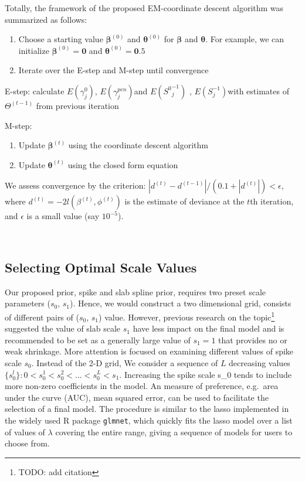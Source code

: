 \documentclass[AMA,STIX1COL,]{WileyNJD-v2}
\begin{document}
Totally, the framework of the proposed EM-coordinate descent algorithm
was summarized as follows:

\begin{enumerate}
\def\labelenumi{\arabic{enumi})}
\item
  Choose a starting value \(\boldsymbol{\beta}^{(0)}\) and
  \(\boldsymbol{\theta}^{(0)}\) for \(\boldsymbol{\beta}\) and
  \(\boldsymbol{\theta}\). For example, we can initialize
  \(\boldsymbol{\beta}^{(0)} = \boldsymbol{0}\) and
  \(\boldsymbol{\theta}^{(0)} = \boldsymbol{0}.5\)
\item
  Iterate over the E-step and M-step until convergence
\end{enumerate}

E-step: calculate \(E(\gamma^0_{j})\), \(E(\gamma^{pen}_{j})\)and
\(E({S^0}^{-1}_{j})\) , \(E({S}^{-1}_{j})\)with estimates of
\(\Theta^{(t-1)}\) from previous iteration

M-step:

\begin{enumerate}
\def\labelenumi{\alph{enumi})}
\item
  Update \(\boldsymbol{\beta}^{(t)}\) using the coordinate descent
  algorithm
\item
  Update \(\boldsymbol{\theta}^{(t)}\) using the closed form equation
\end{enumerate}

We assess convergence by the criterion:
\(|d^{(t)}-d^{(t-1)}|/(0.1+|d^{(t)}|)<\epsilon\), where
\(d^{(t)} = -2l(\beta^{(t)},\phi^{(t)})\) is the estimate of deviance at
the \(t\)th iteration, and \(\epsilon\) is a small value (say
\(10^{-5}\)).

~

\hypertarget{selecting-optimal-scale-values}{%
\subsection{Selecting Optimal Scale
Values}\label{selecting-optimal-scale-values}}

Our proposed prior, spike and slab spline prior, requires two preset
scale parameters (\(s_0\), \(s_1\)). Hence, we would construct a two
dimensional grid, consists of different pairs of (\(s_0\), \(s_1\))
value. However, previous research on the topic\footnote{TODO: add
  citation} suggested the value of slab scale \(s_1\) have less impact
on the final model and is recommended to be set as a generally large
value of \(s_1 = 1\) that provides no or weak shrinkage. More attention
is focused on examining different values of spike scale \(s_0\). Instead
of the 2-D grid, We consider a sequence of \(L\) decreasing values
\(\{s_0^l\}: 0 < s_0^1 < s_0^2 < \dots < s_0^L < s_1\). Increasing the
spike scale s\_0 tends to include more non-zero coefficients in the
model. An measure of preference, e.g.~area under the curve (AUC), mean
squared error, can be used to facilitate the selection of a final model.
The procedure is similar to the lasso implemented in the widely used R
package \texttt{glmnet}, which quickly fits the lasso model over a list
of values of \(\lambda\) covering the entire range, giving a sequence of
models for users to choose from.
\end{document}
